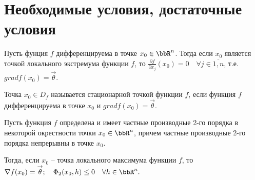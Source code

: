 \section{Необходимые условия, достаточные условия}

\begin{thm} \label{ch10thm1}
Пусть фунция $f$ дифференцируема в точке $x_0 \in \bbR^n$. Тогда если $x_0$ является точкой локального экстремума функции $f$, то $\frac{\partial f}{\partial x_j}(x_0) = 0 \quad \forall j \in \overline{1,n}$, т.е. $grad f(x_0) = \overset{\rightarrow}{\theta}.$
\end{thm}

\begin{defn}
Точка $x_0 \in D_f$ называется стационарной точкой функции $f$, если функция $f$ дифференцируема в точке $x_0$ и $grad f(x_0) = \overset{\rightarrow}{\theta}$.
\end{defn}

\begin{thm}
Пусть функция $f$ определена и имеет частные производные 2-го порядка в некоторой окрестности точки $x_0 \in \bbR^n$, причем частные производные 2-го порядка непрерывны в точке $x_0$.

Тогда, если $x_0$ -- точка локального максимума функции $f$, то $\nabla f(x_0) = \overset{\rightarrow}{\theta}; \quad \Phi_2(x_0, h) \le 0 \quad \forall h \in \bbR^n.$
\end{thm}


